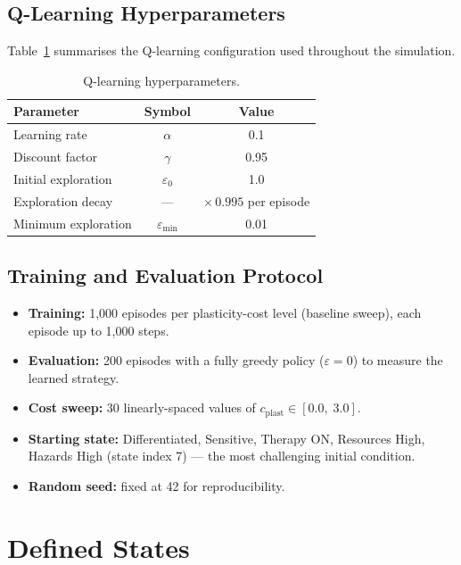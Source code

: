 \documentclass[12pt,a4paper]{article}
\begin{document}
\subsection{Q-Learning Hyperparameters}

Table~\ref{tab:hyperparams} summarises the Q-learning configuration used throughout the simulation.

\begin{table}[H]
\centering
\caption{Q-learning hyperparameters.}
\label{tab:hyperparams}
\begin{tabular}{lcc}
\toprule
\textbf{Parameter} & \textbf{Symbol} & \textbf{Value} \\
\midrule
Learning rate       & $\alpha$        & 0.1            \\
Discount factor     & $\gamma$        & 0.95           \\
Initial exploration & $\varepsilon_0$ & 1.0            \\
Exploration decay   & ---             & $\times\,0.995$ per episode \\
Minimum exploration & $\varepsilon_{\min}$ & 0.01      \\
\bottomrule
\end{tabular}
\end{table}

\subsection{Training and Evaluation Protocol}

\begin{itemize}[nosep]
    \item \textbf{Training:} 1{,}000 episodes per plasticity-cost level (baseline sweep), each episode up to 1{,}000 steps.
    \item \textbf{Evaluation:} 200 episodes with a fully greedy policy ($\varepsilon = 0$) to measure the learned strategy.
    \item \textbf{Cost sweep:} 30 linearly-spaced values of $c_{\text{plast}} \in [0.0,\; 3.0]$.
    \item \textbf{Starting state:} Differentiated, Sensitive, Therapy ON, Resources High, Hazards High (state index 7) --- the most challenging initial condition.
    \item \textbf{Random seed:} fixed at 42 for reproducibility.
\end{itemize}

\section{Defined States}
\end{document}
